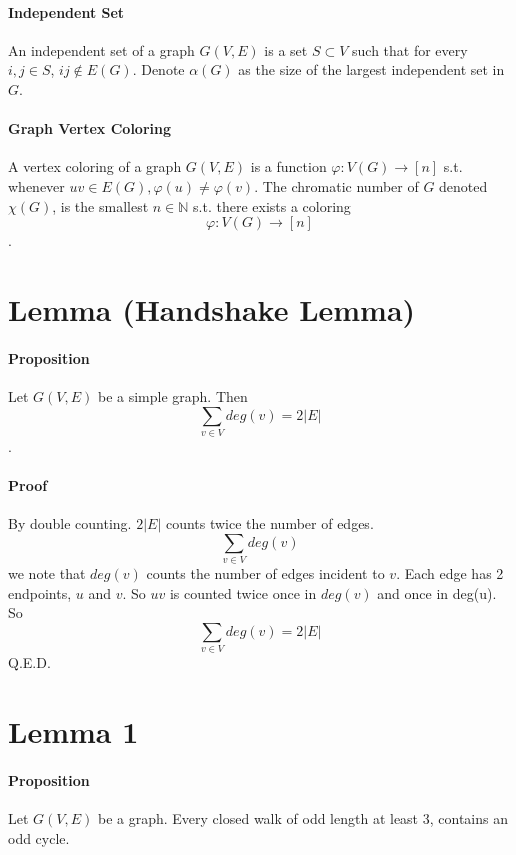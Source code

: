 \documentclass{article}
\begin{document}
\paragraph{Independent Set} An independent set of a graph $G(V,E)$ is a set $S \subset V$ such that for every $i,j \in S$, $ij \notin E(G)$. Denote $\alpha(G)$ as the size of the largest independent set in $G$.
\paragraph{Graph Vertex Coloring} A vertex coloring of a graph $G(V, E)$ is a function $\varphi : V(G) \rightarrow [n]$ s.t. whenever $uv\in E(G), \varphi(u) \neq \varphi(v)$. The chromatic number of $G$ denoted $\chi(G)$, is the smallest $n \in \mathbb{N}$ s.t. there exists a coloring $$\varphi:V(G)\rightarrow [n]$$. 



\section{Lemma (Handshake Lemma)}
\paragraph{Proposition} Let $G(V, E)$ be a simple graph. Then $$\sum_{v\in V}deg(v) = 2|E|$$.
\paragraph{Proof} By double counting. $2|E|$ counts twice the number of edges. $$\sum_{v\in V}deg(v)$$we note that $deg(v)$ counts the number of edges incident to $v$. Each edge has 2 endpoints, $u$ and $v$. So $uv$ is counted twice once in $deg(v)$ and once in deg(u). So  $$\sum_{v\in V}deg(v) = 2|E|$$ Q.E.D.

\section{Lemma 1}
\paragraph{Proposition} Let $G(V, E)$ be a graph. Every closed walk of odd length at least 3, contains an odd cycle.
\end{document}
